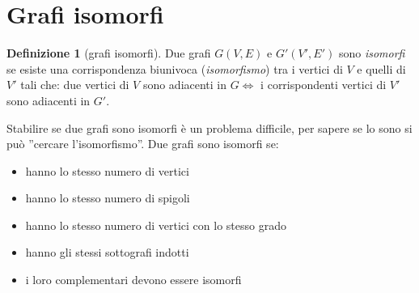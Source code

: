 \documentclass[a4paper, oneside, openany]{book}
\theoremstyle{plain}
\theoremstyle{definition}
\newtheorem{defn}{Definizione}[chapter]
\begin{document}
\section{Grafi isomorfi}
\begin{defn}[grafi isomorfi]
Due grafi $G(V,E)$ e $G'(V',E')$ sono \emph{isomorfi} se esiste una corrispondenza biunivoca
(\emph{isomorfismo}) tra i vertici di $V$ e quelli di $V'$ tali che: due vertici di $V$ sono
adiacenti in $G \iff $ i corrispondenti vertici di $V'$ sono adiacenti in $G'$. 
\end{defn}
Stabilire se due grafi sono isomorfi è un problema difficile, per 
sapere se lo sono si può ''cercare l'isomorfismo''.
Due grafi sono isomorfi se:
\begin{itemize}
    \item hanno lo stesso numero di vertici
    \item hanno lo stesso numero di spigoli
    \item hanno lo stesso numero di vertici con lo stesso grado
    \item hanno gli stessi sottografi indotti
    \item i loro complementari devono essere isomorfi
\end{itemize}
\end{document}
